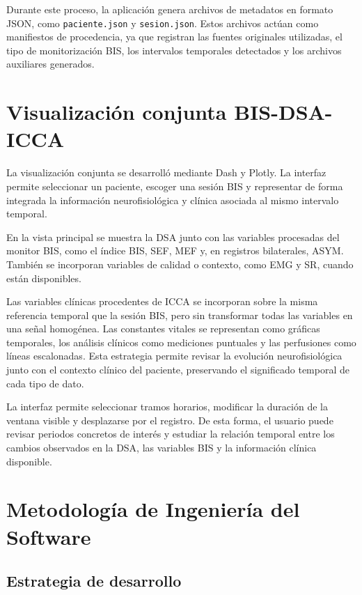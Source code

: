 \documentclass[
  spanish,
  a4paper,
  12pt,
  twoside]{memoir}
\begin{document}
Durante este proceso, la aplicación genera archivos de metadatos en
formato JSON, como \texttt{paciente.json} y \texttt{sesion.json}. Estos
archivos actúan como manifiestos de procedencia, ya que registran las
fuentes originales utilizadas, el tipo de monitorización BIS, los
intervalos temporales detectados y los archivos auxiliares generados.

\section{Visualización conjunta
BIS-DSA-ICCA}\label{visualizaciuxf3n-conjunta-bis-dsa-icca}

La visualización conjunta se desarrolló mediante Dash y Plotly. La
interfaz permite seleccionar un paciente, escoger una sesión BIS y
representar de forma integrada la información neurofisiológica y clínica
asociada al mismo intervalo temporal.

En la vista principal se muestra la DSA junto con las variables
procesadas del monitor BIS, como el índice BIS, SEF, MEF y, en registros
bilaterales, ASYM. También se incorporan variables de calidad o
contexto, como EMG y SR, cuando están disponibles.

Las variables clínicas procedentes de ICCA se incorporan sobre la misma
referencia temporal que la sesión BIS, pero sin transformar todas las
variables en una señal homogénea. Las constantes vitales se representan
como gráficas temporales, los análisis clínicos como mediciones
puntuales y las perfusiones como líneas escalonadas. Esta estrategia
permite revisar la evolución neurofisiológica junto con el contexto
clínico del paciente, preservando el significado temporal de cada tipo
de dato.

La interfaz permite seleccionar tramos horarios, modificar la duración
de la ventana visible y desplazarse por el registro. De esta forma, el
usuario puede revisar periodos concretos de interés y estudiar la
relación temporal entre los cambios observados en la DSA, las variables
BIS y la información clínica disponible.

\section{Metodología de Ingeniería del
Software}\label{metodologuxeda-de-ingenieruxeda-del-software}

\subsection{Estrategia de desarrollo}\label{estrategia-de-desarrollo}
\end{document}
